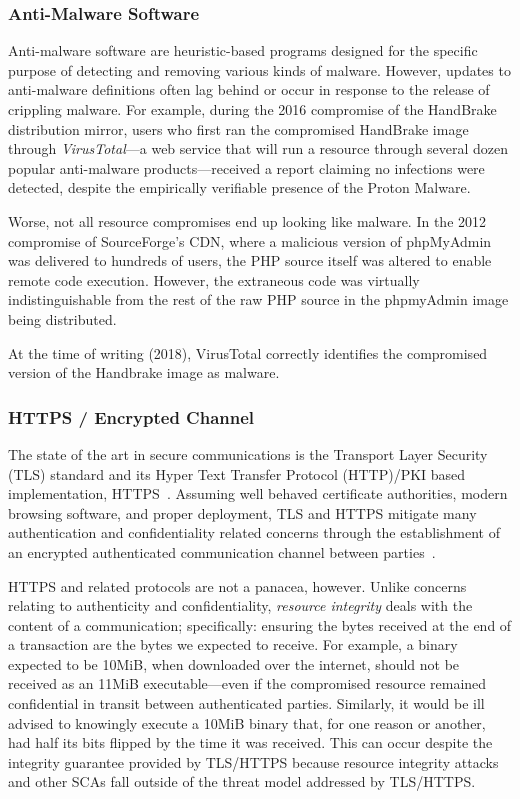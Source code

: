 \subsubsection{Anti-Malware Software}

Anti-malware software are heuristic-based programs designed for the specific
purpose of detecting and removing various kinds of malware. However, updates to
anti-malware definitions often lag behind or occur in response to the release of
crippling malware. For example, during the 2016 compromise of the HandBrake
distribution mirror, users who first ran the compromised HandBrake image
through \textit{VirusTotal}---a web service that will run a resource through
several dozen popular anti-malware products---received a report claiming no
infections were detected, despite the empirically verifiable presence of the
Proton Malware.

Worse, not all resource compromises end up looking like malware. In the 2012
compromise of SourceForge's CDN, where a malicious version of phpMyAdmin was
delivered to hundreds of users, the PHP source itself was altered to enable
remote code execution. However, the extraneous code was virtually
indistinguishable from the rest of the raw PHP source in the phpmyAdmin image
being distributed.

At the time of writing (2018), VirusTotal correctly identifies the compromised
version of the Handbrake image as malware.

\subsubsection{HTTPS / Encrypted Channel}

The state of the art in secure communications is the Transport Layer Security
(TLS) standard and its Hyper Text Transfer Protocol (HTTP)/PKI based
implementation, HTTPS~\cite{TLS1.2, HTTPS, PKI}. Assuming well behaved
certificate authorities, modern browsing software, and proper deployment, TLS
and HTTPS mitigate many authentication and confidentiality related concerns
through the establishment of an encrypted authenticated communication channel
between parties~\cite{HTTPS, TLS1.2, DTLS}.

HTTPS and related protocols are not a panacea, however. Unlike concerns relating
to authenticity and confidentiality, \textit{resource integrity} deals with the
content of a communication; specifically: ensuring the bytes received at the end
of a transaction are the bytes we expected to receive. For example, a binary
expected to be 10MiB, when downloaded over the internet, should not be received
as an 11MiB executable---even if the compromised resource remained confidential
in transit between authenticated parties. Similarly, it would be ill advised to
knowingly execute a 10MiB binary that, for one reason or another, had half its
bits flipped by the time it was received. This can occur despite the integrity
guarantee provided by TLS/HTTPS because resource integrity attacks and other
SCAs fall outside of the threat model addressed by TLS/HTTPS.


